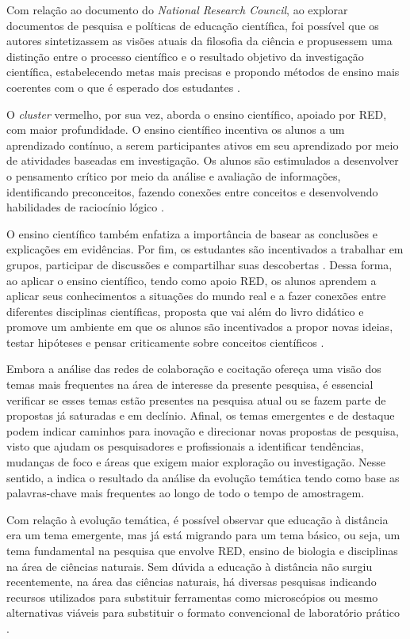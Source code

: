 \documentclass[portuguese]{textolivre}
\begin{document}
Com relação ao documento do \textit{National Research Council}, ao explorar documentos de pesquisa e políticas de educação científica, foi possível que os autores sintetizassem as visões atuais da filosofia da ciência e propusessem uma distinção entre o processo científico e o resultado objetivo da investigação científica, estabelecendo metas mais precisas e propondo métodos de ensino mais coerentes com o que é esperado dos estudantes \cite{keller_framework_2012}.

O \textit{cluster} vermelho, por sua vez, aborda o ensino científico, apoiado por RED, com maior profundidade. O ensino científico incentiva os alunos a um aprendizado contínuo, a serem participantes ativos em seu aprendizado por meio de atividades baseadas em investigação. Os alunos são estimulados a desenvolver o pensamento crítico por meio da análise e avaliação de informações, identificando preconceitos, fazendo conexões entre conceitos e desenvolvendo habilidades de raciocínio lógico \cite{american_association_for_the_advancement_of_science_vision_2011}.

O ensino científico também enfatiza a importância de basear as conclusões e explicações em evidências. Por fim, os estudantes são incentivados a trabalhar em grupos, participar de discussões e compartilhar suas descobertas \cite{couch_scientific_2015}. Dessa forma, ao aplicar o ensino científico, tendo como apoio RED, os alunos aprendem a aplicar seus conhecimentos a situações do mundo real e a fazer conexões entre diferentes disciplinas científicas, proposta que vai além do livro didático e promove um ambiente em que os alunos são incentivados a propor novas ideias, testar hipóteses e pensar criticamente sobre conceitos científicos \cite{couch_scientific_2015}.

Embora a análise das redes de colaboração e cocitação ofereça uma visão dos temas mais frequentes na área de interesse da presente pesquisa, é essencial verificar se esses temas estão presentes na pesquisa atual ou se fazem parte de propostas já saturadas e em declínio. Afinal, os temas emergentes e de destaque podem indicar caminhos para inovação e direcionar novas propostas de pesquisa, visto que ajudam os pesquisadores e profissionais a identificar tendências, mudanças de foco e áreas que exigem maior exploração ou investigação. Nesse sentido, a  indica o resultado da análise da evolução temática tendo como base as palavras-chave mais frequentes ao longo de todo o tempo de amostragem.

Com relação à evolução temática, é possível observar que educação à distância era um tema emergente, mas já está migrando para um tema básico, ou seja, um tema fundamental na pesquisa que envolve RED, ensino de biologia e disciplinas na área de ciências naturais. Sem dúvida a educação à distância não surgiu recentemente, na área das ciências naturais, há diversas pesquisas indicando recursos utilizados para substituir ferramentas como microscópios ou mesmo alternativas viáveis para substituir o formato convencional de laboratório prático \cite{winkelmann_development_2017}.
\end{document}
